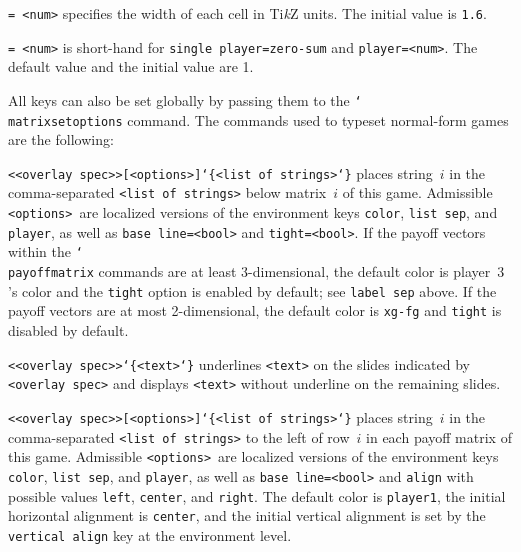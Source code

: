 \documentclass{article}
\newenvironment{desc}{\itemize[leftmargin=50pt]}{\enditemize}
\def\macro#1{\item[\cmd{#1}]}
\def\macroarg#1#2{\item[\cmd{#1}] \hskip-2.5pt\texttt{#2}}
\def\option#1#2{\item[\texttt{#1}] \hskip-1.5pt\texttt{#2}}
\renewcommand{\textbackslash}{\char`\\}
\def\cmd#1{\texttt{\color{cmd}\textbackslash#1}}
\def\leftbrace{\char`\{}
\def\rightbrace{\char`\}}
\def\arg#1{{\color{cmd}\leftbrace}{\color{black}#1}{\color{cmd}\rightbrace}}
\def\optarg[#1]{{\color{player1}[#1]}}
\def\TikZ{Ti\emph{k}Z\xspace}
\begin{document}
\begin{desc}
\option{w}{= <num>} specifies the width of each cell in \TikZ units. The initial value is \texttt{1.6}.

\option{zero-sum}{= <num>} is short-hand for \texttt{single player=zero-sum} and \texttt{player=<num>}. The default value and the initial value are 1. 
\end{desc}

\noindent All keys can also be set globally by passing them to the \cmd{matrixsetoptions} command. The commands used to typeset normal-form games are the following:

\begin{desc}
\macroarg{bottomlabel}{<<overlay spec>>\optarg[<options>]\arg{<list of strings>}} places string~$i$ in the comma-separated \texttt{<list of strings>} below matrix~$i$ of this game. Admissible \texttt{<options>}~are localized versions of the environment keys \texttt{color}, \texttt{list sep}, and \texttt{player}, as well as \texttt{base line=<bool>} and \texttt{tight=<bool>}. If the payoff vectors within the \cmd{payoffmatrix} commands are at least 3-dimensional, the default color is player~$3$'s color and the \texttt{tight} option is enabled by default; see \texttt{label sep} above. If the payoff vectors are at most \hbox{2-dimensional}, the default color is \texttt{xg-fg} and \texttt{tight} is disabled by default. 

\macroarg{br}{<<overlay spec>>\arg{<text>}} underlines \texttt{<text>} on the slides indicated by \texttt{<overlay spec>} and displays \texttt{<text>} without underline on the remaining slides.

\macroarg{leftlabel}{<<overlay spec>>\optarg[<options>]\arg{<list of strings>}} places string~$i$ in the comma-separated \texttt{<list of strings>} to the left of row~$i$ in each payoff matrix of this game. Admissible \texttt{<options>}~are localized versions of the environment keys \texttt{color}, \texttt{list sep}, and \texttt{player}, as well as \texttt{base line=<bool>} and \texttt{align} with possible values \texttt{left}, \texttt{center}, and \texttt{right}. The default color is \texttt{player1}, the initial horizontal alignment is \texttt{center}, and the initial vertical alignment is set by the \texttt{vertical align} key at the environment level.
%


\end{desc}
\end{document}
